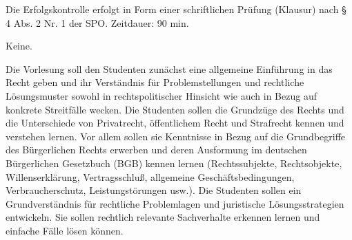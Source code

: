 \begin{course}

\setdoclanguagegerman
{}



\coursehead


\label{cour_4383.dp_997}


\begin{styleenv}
\begin{assessment}
Die Erfolgskontrolle erfolgt in Form einer schriftlichen Prüfung (Klausur) nach § 4 Abs. 2 Nr. 1 der SPO. Zeitdauer: 90 min.


\end{assessment}

\begin{conditions}Keine.\end{conditions}


\end{styleenv}

\begin{learningoutcomes}
Die Vorlesung soll den Studenten zunächst eine allgemeine
Einführung in das Recht geben und ihr Verständnis
für Problemstellungen und rechtliche Lösungsmuster sowohl
in rechtspolitischer Hinsicht wie auch in Bezug auf konkrete
Streitfälle wecken. Die Studenten sollen die Grundzüge
des Rechts und die Unterschiede von Privatrecht, öffentlichem
Recht und Strafrecht kennen und verstehen lernen. Vor allem sollen
sie Kenntnisse in Bezug auf die Grundbegriffe des Bürgerlichen
Rechts erwerben und deren Ausformung im deutschen Bürgerlichen
Gesetzbuch (BGB) kennen lernen (Rechtssubjekte, Rechtsobjekte,
Willenserklärung, Vertragsschluß, allgemeine
Geschäftsbedingungen, Verbraucherschutz,
Leistungstörungen usw.). Die Studenten sollen ein
Grundverständnis für rechtliche Problemlagen und
juristische Lösungsstrategien entwickeln. Sie sollen rechtlich
relevante Sachverhalte erkennen lernen und einfache Fälle
lösen können.
\end{learningoutcomes}


\end{course}
